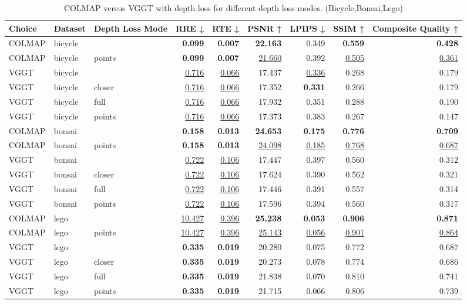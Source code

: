 \begin{table}[H]
\caption{COLMAP versus VGGT with depth loss for different depth loss modes. (Bicycle,Bonsai,Lego)}
\label{tab:05_depth_loss_mode_bicycle,bonsai,lego}
\small
\begin{tabular}{lllrrrrrr}
\toprule
Choice & Dataset & Depth Loss Mode & RRE ↓ & RTE ↓ & PSNR ↑ & LPIPS ↓ & SSIM ↑ & Composite Quality ↑ \\
\midrule
COLMAP & bicycle &  & \textbf{0.099} & \textbf{0.007} & \textbf{22.163} & 0.349 & \textbf{0.559} & \textbf{0.428} \\
COLMAP & bicycle & points & \textbf{0.099} & \textbf{0.007} & \underline{21.660} & 0.392 & \underline{0.505} & \underline{0.361} \\
VGGT & bicycle &  & \underline{0.716} & \underline{0.066} & 17.437 & \underline{0.336} & 0.268 & 0.179 \\
VGGT & bicycle & closer & \underline{0.716} & \underline{0.066} & 17.352 & \textbf{0.331} & 0.266 & 0.179 \\
VGGT & bicycle & full & \underline{0.716} & \underline{0.066} & 17.932 & 0.351 & 0.288 & 0.190 \\
VGGT & bicycle & points & \underline{0.716} & \underline{0.066} & 17.373 & 0.383 & 0.267 & 0.147 \\
\midrule
COLMAP & bonsai &  & \textbf{0.158} & \textbf{0.013} & \textbf{24.653} & \textbf{0.175} & \textbf{0.776} & \textbf{0.709} \\
COLMAP & bonsai & points & \textbf{0.158} & \textbf{0.013} & \underline{24.098} & \underline{0.185} & \underline{0.768} & \underline{0.687} \\
VGGT & bonsai &  & \underline{0.722} & \underline{0.106} & 17.447 & 0.397 & 0.560 & 0.312 \\
VGGT & bonsai & closer & \underline{0.722} & \underline{0.106} & 17.624 & 0.390 & 0.562 & 0.321 \\
VGGT & bonsai & full & \underline{0.722} & \underline{0.106} & 17.446 & 0.391 & 0.557 & 0.314 \\
VGGT & bonsai & points & \underline{0.722} & \underline{0.106} & 17.596 & 0.394 & 0.560 & 0.317 \\
\midrule
COLMAP & lego &  & \underline{10.427} & \underline{0.396} & \textbf{25.238} & \textbf{0.053} & \textbf{0.906} & \textbf{0.871} \\
COLMAP & lego & points & \underline{10.427} & \underline{0.396} & \underline{25.143} & \underline{0.056} & \underline{0.901} & \underline{0.864} \\
VGGT & lego &  & \textbf{0.335} & \textbf{0.019} & 20.280 & 0.075 & 0.772 & 0.687 \\
VGGT & lego & closer & \textbf{0.335} & \textbf{0.019} & 20.273 & 0.078 & 0.774 & 0.686 \\
VGGT & lego & full & \textbf{0.335} & \textbf{0.019} & 21.838 & 0.070 & 0.810 & 0.741 \\
VGGT & lego & points & \textbf{0.335} & \textbf{0.019} & 21.715 & 0.066 & 0.806 & 0.739 \\
\bottomrule
\end{tabular}
\end{table}
